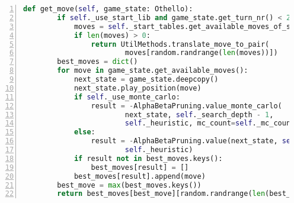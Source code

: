 \begin{lstlisting}[basicstyle=\footnotesize,caption = {get\_move Funktion des \abp Agenten}, language = python, captionpos = t , numbers=left, label={lst:ab-get-move}]
    def get_move(self, game_state: Othello):
        if self._use_start_lib and game_state.get_turn_nr() < 21:
            moves = self._start_tables.get_available_moves_of_start_tables(game_state)
            if len(moves) > 0:
                return UtilMethods.translate_move_to_pair(
                		moves[random.randrange(len(moves))])
        best_moves = dict()
        for move in game_state.get_available_moves():
            next_state = game_state.deepcopy()
            next_state.play_position(move)
            if self._use_monte_carlo:
                result = -AlphaBetaPruning.value_monte_carlo(
                		next_state, self._search_depth - 1, 
                		self._heuristic, mc_count=self._mc_count)
            else:
                result = -AlphaBetaPruning.value(next_state, self._search_depth - 1, 
                		self._heuristic)
            if result not in best_moves.keys():
                best_moves[result] = []
            best_moves[result].append(move)
        best_move = max(best_moves.keys())
        return best_moves[best_move][random.randrange(len(best_moves[best_move]))]
\end{lstlisting}

